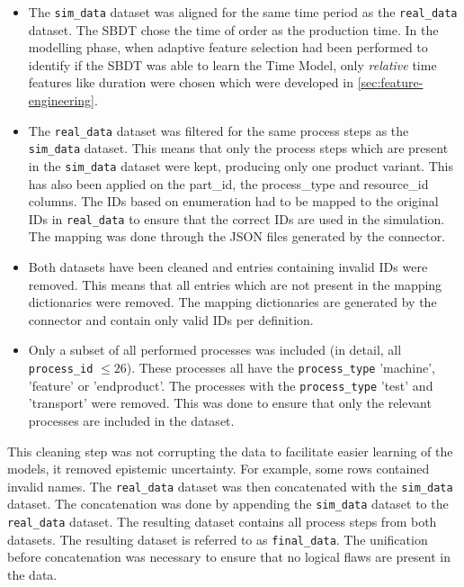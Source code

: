 \begin{itemize}
    \item The \texttt{sim\_data} dataset was aligned for the same time period as the \texttt{real\_data} dataset. The SBDT chose the time of order as the production time. In the modelling phase, when adaptive feature selection had been performed to identify if the SBDT was able to learn the Time Model, only \textit{relative} time features like duration were chosen which were developed in \autoref{sec:feature-engineering}.
    \item The \texttt{real\_data} dataset was filtered for the same process steps as the \texttt{sim\_data} dataset. This means that only the process steps which are present in the \texttt{sim\_data} dataset were kept, producing only one product variant. This has also been applied on the part\_id, the process\_type and resource\_id columns. The IDs based on enumeration had to be mapped to the original IDs in \texttt{real\_data} to ensure that the correct IDs are used in the simulation. The mapping was done through the JSON files generated by the connector.
    \item Both datasets have been cleaned and entries containing invalid IDs were removed. This means that all entries which are not present in the mapping dictionaries were removed. The mapping dictionaries are generated by the connector and contain only valid IDs per definition.
    \item Only a subset of all performed processes was included (in detail, all \texttt{process\_id} $\le 26$). These processes all have the \texttt{process\_type} 'machine', 'feature' or 'endproduct'. The processes with the \texttt{process\_type} 'test' and 'transport' were removed. This was done to ensure that only the relevant processes are included in the dataset.
\end{itemize}

This cleaning step was not corrupting the data to facilitate easier learning of the models, it removed epistemic uncertainty. For example, some rows contained invalid names.
The \texttt{real\_data} dataset was then concatenated with the \texttt{sim\_data} dataset. The concatenation was done by appending the \texttt{sim\_data} dataset to the \texttt{real\_data} dataset. The resulting dataset contains all process steps from both datasets. The resulting dataset is referred to as \texttt{final\_data}. The unification before concatenation was necessary to ensure that no logical flaws are present in the data.

